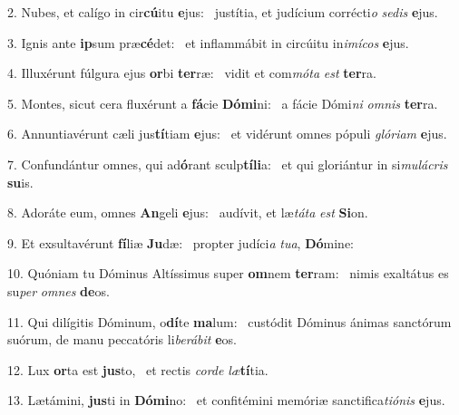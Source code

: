 2. Nubes, et calígo in cir\textbf{cú}itu \textbf{e}jus: \ast\  justítia, et judícium corrécti\textit{o} \textit{se}\textit{dis} \textbf{e}jus.\

3. Ignis ante \textbf{ip}sum præ\textbf{cé}det: \ast\  et inflammábit in circúitu in\textit{i}\textit{mí}\textit{cos} \textbf{e}jus.\

4. Illuxérunt fúlgura ejus \textbf{or}bi \textbf{ter}ræ: \ast\  vidit et com\textit{mó}\textit{ta} \textit{est} \textbf{ter}ra.\

5. Montes, sicut cera fluxérunt a \textbf{fá}cie \textbf{Dó}\textbf{mi}ni: \ast\  a fácie Dómi\textit{ni} \textit{om}\textit{nis} \textbf{ter}ra.\

6. Annuntiavérunt cæli jus\textbf{tí}tiam \textbf{e}jus: \ast\  et vidérunt omnes pópuli \textit{gló}\textit{ri}\textit{am} \textbf{e}jus.\

7. Confundántur omnes, qui ad\textbf{ó}rant sculp\textbf{tí}\textbf{li}a: \ast\  et qui gloriántur in si\textit{mu}\textit{lá}\textit{cris} \textbf{su}is.\

8. Adoráte eum, omnes \textbf{An}geli \textbf{e}jus: \ast\  audívit, et læ\textit{tá}\textit{ta} \textit{est} \textbf{Si}on.\

9. Et exsultavérunt \textbf{fí}liæ \textbf{Ju}dæ: \ast\  propter judíci\textit{a} \textit{tu}\textit{a}, \textbf{Dó}mine:\

10. Quóniam tu Dóminus Altíssimus super \textbf{om}nem \textbf{ter}ram: \ast\  nimis exaltátus es su\textit{per} \textit{om}\textit{nes} \textbf{de}os.\

11. Qui dilígitis Dóminum, o\textbf{dí}te \textbf{ma}lum: \ast\  custódit Dóminus ánimas sanctórum suórum, de manu peccatóris li\textit{be}\textit{rá}\textit{bit} \textbf{e}os.\

12. Lux \textbf{or}ta est \textbf{jus}to, \ast\  et rectis \textit{cor}\textit{de} \textit{læ}\textbf{tí}tia.\

13. Lætámini, \textbf{jus}ti in \textbf{Dó}\textbf{mi}no: \ast\  et confitémini memóriæ sanctifica\textit{ti}\textit{ó}\textit{nis} \textbf{e}jus.\

